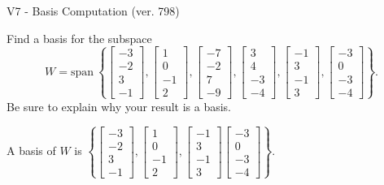 \begin{exercise}
  \begin{exerciseTitle}V7 - Basis Computation (ver. 798)\end{exerciseTitle}
  \begin{exerciseStatement}
    Find a basis for the subspace 
\[W=\mathrm{span}\ \left\{\left[\begin{array}{r}
-3 \\
-2 \\
3 \\
-1
\end{array}\right] , \left[\begin{array}{r}
1 \\
0 \\
-1 \\
2
\end{array}\right] , \left[\begin{array}{r}
-7 \\
-2 \\
7 \\
-9
\end{array}\right] , \left[\begin{array}{r}
3 \\
4 \\
-3 \\
-4
\end{array}\right] , \left[\begin{array}{r}
-1 \\
3 \\
-1 \\
3
\end{array}\right] , \left[\begin{array}{r}
-3 \\
0 \\
-3 \\
-4
\end{array}\right]\right\}.\]
 Be sure to explain why your result is a basis.


  \end{exerciseStatement}
  \begin{exerciseAnswer}
   A basis of \(W\) is  \(\left\{\left[\begin{array}{r}
-3 \\
-2 \\
3 \\
-1
\end{array}\right] , \left[\begin{array}{r}
1 \\
0 \\
-1 \\
2
\end{array}\right] , \left[\begin{array}{r}
-1 \\
3 \\
-1 \\
3
\end{array}\right] \left[\begin{array}{r}
-3 \\
0 \\
-3 \\
-4
\end{array}\right]\right\}\).
  


  \end{exerciseAnswer}
\end{exercise}